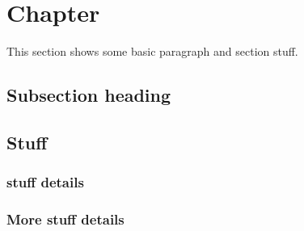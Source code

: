 \section{Chapter}
\label{chap:Chapter}
This section shows some basic paragraph and section stuff.

\subsection{Subsection heading}
\blindtext[1]
\breakit %
\blindtext[1]

\subsection{Stuff}
\blindtext[1]

\subsubsection{stuff details}
\blindtext[1]

\subsubsection{More stuff details}
\blindtext[1]
